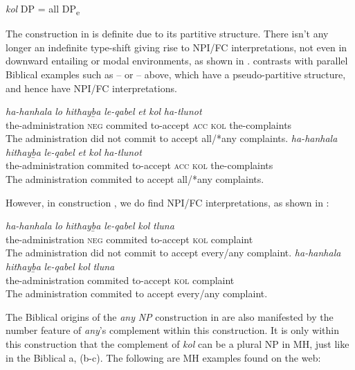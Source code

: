 \documentclass[output=paper]{langsci/langscibook}
\begin{document}
\ea%
    \label{ex:doron:57}
    \textit{kol} DP  =  all  DP\textsubscript{e}
\z

The construction in  is definite due to its partitive structure. There isn’t any longer an indefinite type-shift  giving rise to NPI/FC interpretations, not even in downward entailing or modal environments, as shown in .   contrasts with parallel Biblical examples such as  –  or  –  above, which have a pseudo-partitive structure, and hence have NPI/FC interpretations.

\ea%
    \label{ex:doron:58}
    \ea
    \gll \textit{ha-hanhala}            \textit{lo}     \textit{hitħayḇa}   \textit{le-qabel}     \textit{et}    \textit{kol}    \textit{ha-tlunot} \\
         the-administration \textsc{neg} commited  to-accept  \textsc{acc} \textsc{kol}  the-complaints  \\
    \glt The administration did not commit to accept all/*any complaints.
    \ex
    \gll \textit{ha-hanhala}            \textit{hitħayḇa}    \textit{le-qabel}     \textit{et}    \textit{kol}   \textit{ha-tlunot}           \\
         the-administration commited  to-accept  \textsc{acc} \textsc{kol}  the-complaints  \\
    \glt The administration commited to accept all/*any complaints.
    \z
\z

However, in construction , we do find NPI/FC interpretations, as shown in :

\ea%
    \label{ex:doron:59}
    \ea
    \gll \textit{ha-hanhala}            \textit{lo}     \textit{hitħayḇa}   \textit{le-qabel}    \textit{kol}    \textit{tluna} \\
         the-administration \textsc{neg} commited  to-accept  \textsc{kol}  complaint   \\
    \glt The administration did not commit to accept every/any complaint.
    \ex
    \gll \textit{ha-hanhala}             \textit{hitħayḇa}    \textit{le-qabel}    \textit{kol}    \textit{tluna}          \\
         the-administration  commited  to-accept  \textsc{kol}  complaint  \\
    \glt The administration commited to accept every/any complaint.
    \z
\z

The Biblical origins of the \textit{any} \textit{NP} construction in  are also manifested by the number feature of \textit{any}’s complement within this construction. It is only within this construction that the complement of \textit{kol} can be a plural NP in MH, just like in the Biblical a, (b-c). The following are MH examples found on the web:~
\end{document}
